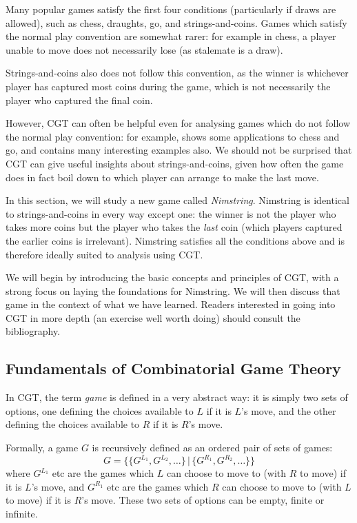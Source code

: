 \documentclass[a4paper,twocolumn]{article}
\begin{document}
Many popular games satisfy the first four conditions (particularly if
draws are allowed), such as chess, draughts, go, and
strings-and-coins. Games which satisfy the normal play convention are
somewhat rarer: for example in chess, a player unable to move does not
necessarily lose (as stalemate is a draw).

Strings-and-coins also does not follow this convention, as the winner
is whichever player has captured most coins during the game, which is
not necessarily the player who captured the final coin.

However, CGT can often be helpful even for analysing games which do
not follow the normal play convention: for example, \cite{nochance}
shows some applications to chess and go, and \cite{wways} contains
many interesting examples also. We should not be surprised that CGT
can give useful insights about strings-and-coins, given how often the
game does in fact boil down to which player can arrange to make the
last move.

In this section, we will study a new game called
\emph{Nimstring}. Nimstring is identical to strings-and-coins in every
way except one: the winner is not the player who takes more coins but
the player who takes the \emph{last} coin (which players captured the
earlier coins is irrelevant). Nimstring satisfies all the conditions
above and is therefore ideally suited to analysis using CGT.

We will begin by introducing the basic concepts and principles of CGT,
with a strong focus on laying the foundations for Nimstring. We will
then discuss that game in the context of what we have learned. Readers
interested in going into CGT in more depth (an exercise well worth
doing) should consult the bibliography.

\subsection{Fundamentals of Combinatorial Game Theory}

In CGT, the term \emph{game} is defined in a very abstract way: it is
simply two sets of options, one defining the choices available to $L$
if it is $L$'s move, and the other defining the choices available to
$R$ if it is $R$'s move.

Formally, a game $G$ is recursively defined as an ordered pair of sets
of games: $$G = \{\{G^{L_1}, G^{L_2}, \ldots\} \,|\, \{G^{R_1},
G^{R_2}, \ldots\}\}$$ where $G^{L_1}$ etc are the games which $L$ can
choose to move to (with $R$ to move) if it is $L$'s move, and
$G^{R_1}$ etc are the games which $R$ can choose to move to (with $L$
to move) if it is $R$'s move. These two sets of options can be empty,
finite or infinite.
\end{document}
